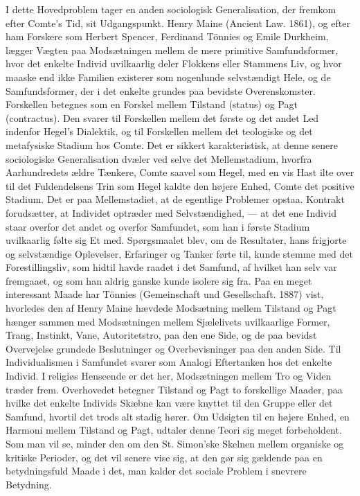 \documentclass[12pt,a4paper,openany]{book}
\newcommand{\opage}[1]{\marginnote{\footnotesize\textit{[#1]}}}
\begin{document}
I dette Hovedproblem tager en anden sociologisk Generalisation,
der fremkom efter Comte’s Tid, sit Udgangspunkt. Henry Maine
(Ancient Law. 1861), og efter ham Forskere som Herbert Spencer,
Ferdinand Tönnies og Emile Durkheim, lægger Vægten paa Modsætningen
mellem de mere primitive Samfundsformer, hvor det enkelte
Individ uvilkaarlig deler Flokkens eller Stammens Liv, og hvor maaske
end ikke Familien existerer som nogenlunde selvstændigt Hele,
og de Samfundsformer, der i det enkelte grundes paa bevidste Overenskomster.
Forskellen betegnes som en Forskel mellem Tilstand
(status) og Pagt (contractus). Den svarer til Forskellen mellem det
første og det andet Led indenfor Hegel’s Dialektik, og til Forskellen
mellem det teologiske og det metafysiske Stadium hos Comte. Det er
sikkert karakteristisk, at denne senere sociologiske Generalisation
dvæler ved selve det Mellemstadium, hvorfra Aarhundredets ældre
Tænkere, Comte saavel som Hegel, med en vis Hast ilte over til det
Fuldendelsens Trin som Hegel kaldte den højere Enhed, Comte det
positive Stadium. Det er paa Mellemstadiet, at de egentlige Problemer
opstaa. Kontrakt forudsætter, at Individet optræder med Selvstændighed,
--- at det ene Individ staar overfor det andet og overfor
Samfundet, som han i første Stadium uvilkaarlig følte sig Et med.
Spørgsmaalet blev, om de Resultater, hans frigjorte og selvstændige
Oplevelser, Erfaringer og Tanker førte til, kunde stemme med det
Forestillingsliv, som hidtil havde raadet i det Samfund, af hvilket
han selv var fremgaaet, og som han aldrig ganske kunde isolere sig
fra. Paa en meget interessant Maade har Tönnies (Gemeinschaft und
Gesellschaft. 1887) vist, hvorledes den af Henry Maine hævdede Modsætning
mellem Tilstand og Pagt hænger sammen med Modsætningen
mellem Sjælelivets uvilkaarlige Former, Trang, Instinkt, Vane,
\opage{57}Autoritetstro, paa den ene Side, og de paa bevidst Overvejelse grundede
Beslutninger og Overbevisninger paa den anden Side. Til Individualismen
i Samfundet svarer som Analogi Eftertanken hos det
enkelte Individ. I religiøs Henseende er det her, Modsætningen mellem
Tro og Viden træder frem. Overhovedet betegner Tilstand og
Pagt to forskellige Maader, paa hvilke det enkelte Individs Skæbne
kan være knyttet til den Gruppe eller det Samfund, hvortil det trods
alt stadig hører. Om Udsigten til en højere Enhed, en Harmoni mellem
Tilstand og Pagt, udtaler denne Teori sig meget forbeholdent.
Som man vil se, minder den om den St. Simon’ske Skelnen mellem
organiske og kritiske Perioder, og det vil senere vise sig, at den gør
sig gældende paa en betydningsfuld Maade i det, man kalder det
sociale Problem i snevrere Betydning.
\end{document}
